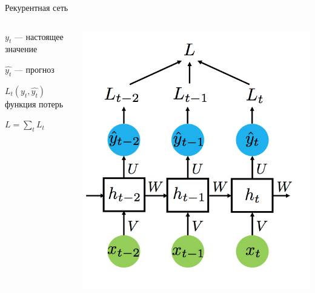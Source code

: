 \documentclass[notes,12pt, aspectratio=169]{beamer}
\newenvironment{wideitemize}{\itemize\addtolength{\itemsep}{10pt}}{\enditemize}
\begin{document}
\begin{frame}{Рекурентная сеть}
\begin{columns}
	\begin{column}{.48\linewidth}
		\begin{wideitemize} 
			\item $y_t$ — настоящее значение
			\item $\hat{y_t}$  — прогноз
			\item $L_t(y_t, \hat{y_t})$  функция потерь
			\item $L = \sum_{t} L_t $
		\end{wideitemize} 
	\end{column}
	\begin{column}{.48\linewidth}
		\begin{center}
			\includegraphics[width=.99\linewidth]{rnn0.png}
		\end{center}
	\end{column}	
\end{columns}
\end{frame}
\end{document}
